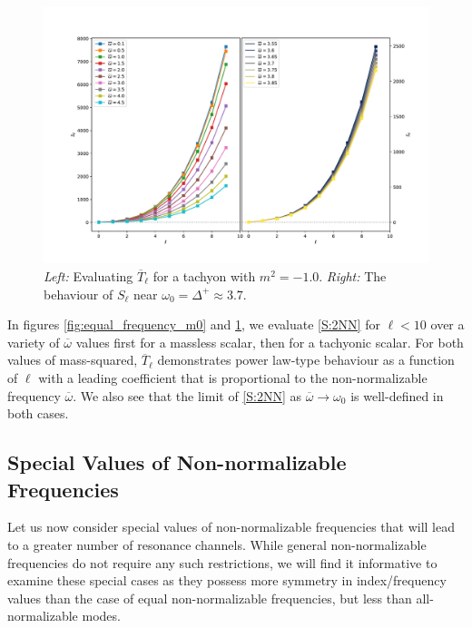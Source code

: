 \documentclass[letterpaper,11pt]{article}
\newcommand{\ob}{\overline{\omega}}
\begin{document}
\begin{figure}[h]
\centering
\includegraphics[width=\textwidth]{./figures/NN_equalfreq_sourceterms_m-1_0+zoom}
\caption{{\it Left:} Evaluating $\overline{T}_{\ell}$ for a tachyon with $m^2 = -1.0$. {\it Right:} The behaviour of $S_\ell$ near $\omega_0 = \Delta^+ \approx  3.7$.}
\label{fig:equal_frequency_m-1_0}
\end{figure}

In figures \ref{fig:equal_frequency_m0} and \ref{fig:equal_frequency_m-1_0}, we evaluate \eqref{S:2NN} for $\ell < 10$ over a variety of $\ob$ values first for a massless scalar, then for a tachyonic scalar. For both values of mass-squared, $\overline{T}_\ell$ demonstrates power law-type behaviour as a function of $\ell$ with a leading coefficient that is proportional to the non-normalizable frequency $\ob$. We also see that the limit of \eqref{S:2NN} as $\ob \to \omega_0$ is well-defined in both cases.


\subsection{Special Values of Non-normalizable Frequencies}

Let us now consider special values of non-normalizable frequencies that will lead to a greater number of resonance channels. While general non-normalizable frequencies do not require any such restrictions, we will find it informative to examine these special cases as they possess more symmetry in index/frequency values than the case of equal non-normalizable frequencies, but less than all-normalizable modes. 
\end{document}
